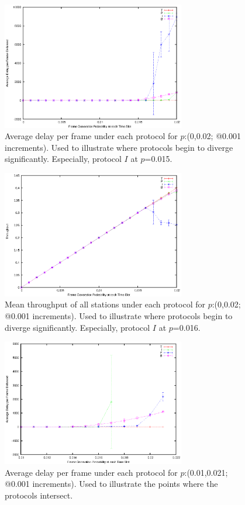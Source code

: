 \documentclass[twocolumn]{article}
\begin{document}
\begin{figure}
    \centering \includegraphics[width=8cm]{plots/ib_diverge_delay.eps}
    \caption{\footnotesize Average delay per frame under each protocol for
    $p$:(0,0.02; @0.001 increments). Used to illustrate where protocols begin to
    diverge significantly. Especially, protocol $I$ at $p$=0.015.}
    \label{fig:delay_ib}
\end{figure}

\begin{figure}
    \centering \includegraphics[width=8cm]{plots/ib_diverge_throughput.eps}
    \caption{\footnotesize Mean throughput of all stations under each protocol
    for $p$:(0,0.02; @0.001 increments). Used to illustrate where protocols
    begin to diverge significantly. Especially, protocol $I$ at $p$=0.016.}
    \label{fig:throughput_ib}
\end{figure}

\begin{figure}
    \centering \includegraphics[width=8cm]{plots/tpbi_delay.eps}
    \caption{\footnotesize Average delay per frame under each protocol for
    $p$:(0.01,0.021; @0.001 increments). Used to illustrate the points where the
    protocols intersect.} \label{fig:delay_diverging}
\end{figure}
\end{document}
